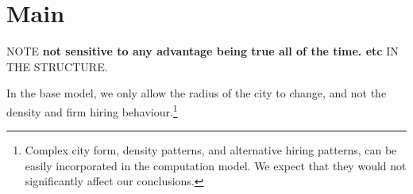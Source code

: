 \section{Main}



NOTE \textbf{not sensitive to any advantage being true all of the time. etc } IN THE STRUCTURE.


In the base model, we only allow the radius of the city to change, and not the density and firm hiring behaviour.\footnote{Complex city form, density patterns, and alternative hiring patterns, can be easily incorporated in the computation model. We expect that they would not significantly affect our conclusions.}  


